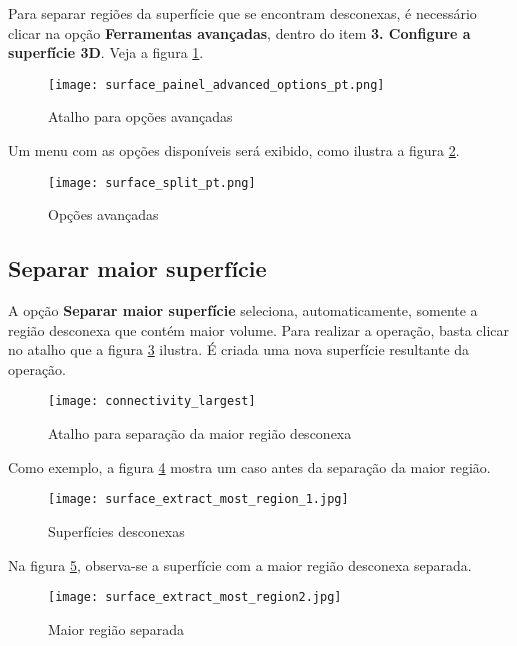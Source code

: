 Para separar regiões da superfície que se encontram desconexas, é necessário clicar na opção
\textbf{Ferramentas avançadas}, dentro do item \textbf{3. Configure a superfície 3D}. Veja a
figura \ref{fig:advanced_tools}.

\begin{figure}[!htb]
\centering
\texttt{[image: surface\_painel\_advanced\_options\_pt.png]}
\caption{Atalho para opções avançadas}
\label{fig:advanced_tools}
\end{figure}

\newpage

Um menu com as opções disponíveis será exibido, como ilustra a figura
\ref{fig:advanced_tools_expanded}.

\begin{figure}[!htb]
\centering
\texttt{[image: surface\_split\_pt.png]}
\caption{Opções avançadas}
\label{fig:advanced_tools_expanded}
\end{figure}

\subsection{Separar maior superfície}

A opção \textbf{Separar maior superfície} seleciona, automaticamente, somente a região
desconexa que contém maior volume. Para realizar a operação, basta clicar no atalho
que a figura \ref{fig:short_connectivity_largest} ilustra. É criada uma nova superfície
resultante da operação.

\begin{figure}[!htb]
\centering
\texttt{[image: connectivity\_largest]}
\caption{Atalho para separação da maior região desconexa}
\label{fig:short_connectivity_largest}
\end{figure}

Como exemplo, a figura \ref{fig:extract_most_region_1} mostra um caso antes da separação
da maior região.

\begin{figure}[!htb]
\centering
\texttt{[image: surface\_extract\_most\_region\_1.jpg]}
\caption{Superfícies desconexas}
\label{fig:extract_most_region_1}
\end{figure}

Na figura \ref{fig:extract_most_region2}, observa-se a superfície com a maior região
desconexa separada.

\begin{figure}[!htb]
\centering
\texttt{[image: surface\_extract\_most\_region2.jpg]}
\caption{Maior região separada}
\label{fig:extract_most_region2}
\end{figure}

